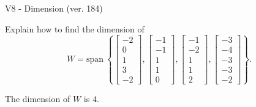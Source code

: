 \begin{exercise}
  \begin{exerciseTitle}V8 - Dimension (ver. 184)\end{exerciseTitle}
  \begin{exerciseStatement}
    Explain how to find the dimension of 
\[W=\mathrm{span}\ \left\{\left[\begin{array}{r}
-2 \\
0 \\
1 \\
3 \\
-2
\end{array}\right] , \left[\begin{array}{r}
-1 \\
-1 \\
1 \\
1 \\
0
\end{array}\right] , \left[\begin{array}{r}
-1 \\
-2 \\
1 \\
1 \\
2
\end{array}\right] , \left[\begin{array}{r}
-3 \\
-4 \\
-3 \\
-3 \\
-2
\end{array}\right]\right\}.\]



  \end{exerciseStatement}
  \begin{exerciseAnswer}
   The dimension of \(W\) is  \(4\).
  


  \end{exerciseAnswer}
\end{exercise}